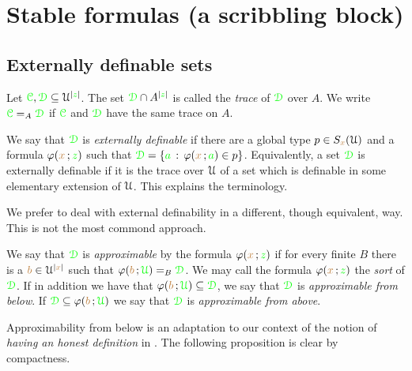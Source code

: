 \documentclass[creche.tex]{subfiles}
\begin{document}
\chapter{Stable formulas (a scribbling block)}
\label{stability}
 
\def\medrel#1{\parbox[t]{6ex}{$\displaystyle\hfil #1$}}
\def\ceq#1#2#3{\parbox{25ex}{$\displaystyle #1$}\medrel{#2}$\displaystyle  #3$}

\section{Externally definable sets}
\label{external}


Let ${\color{green}\EuScript C},{\color{green}\EuScript D}\subseteq\EuScript U^{|{\color{green} z}|}$. The set ${\color{green}\EuScript D}\cap A^{|{\color{green} z}|}$ is called the \emph{trace\/} of ${\color{green}\EuScript D}$ over $A$. We write ${\color{green}\EuScript C}=_A{\color{green}\EuScript D}$ if  ${\color{green}\EuScript C}$ and ${\color{green}\EuScript D}$ have the same trace on $A$.

We say that ${\color{green}\EuScript D}$ is \emph{externally definable\/} if there are a global type $p\in S_{\color{brown} x}(\EuScript U)$ and a formula $\varphi({\color{brown} x}\,;{\color{green} z})$ such that ${\color{green}\EuScript D}=\{{\color{green} a}\,:\,\varphi({\color{brown} x}\,;{\color{green} a})\in p\}$. Equivalently, a set ${\color{green}\EuScript D}$ is externally definable if it is the trace over $\EuScript U$ of a set which is definable in some elementary extension of $\EuScript U$. This explains the terminology.

\noindent\llap{\textcolor{red}{\Large\danger}\kern1.5ex}We prefer to deal with external definability in a different, though equivalent, way. This is not the most commond approach.

\begin{definition}\label{def_epprox}
We say that ${\color{green}\EuScript D}$ is \emph{approximable\/} by the formula $\varphi({\color{brown} x}\,;{\color{green} z})$ if for every finite $B$ there is a ${\color{brown} b}\in\EuScript U^{|{\color{brown} x}|}$ such that $\varphi({\color{brown} b}\,;{\color{green}\EuScript U})=_B{\color{green}\EuScript D}$. We may call the formula $\varphi({\color{brown} x}\,;{\color{green} z})$ the \emph{sort} of ${\color{green}\EuScript D}$. If in addition we have that $\varphi({\color{brown} b}\,;{\color{green}\EuScript U})\subseteq{\color{green}\EuScript D}$, we say that  ${\color{green}\EuScript D}$ is \emph{approximable from below}. If  ${\color{green}\EuScript D}\subseteq\varphi({\color{brown} b}\,;{\color{green}\EuScript U})$ we say that  ${\color{green}\EuScript D}$ is \emph{approximable from above}.\QED
\end{definition} 

Approximability from below is an adaptation to our context of the notion of \textit{having an honest definition} in \cite{CS}.  The following proposition is clear by compactness.
\end{document}
